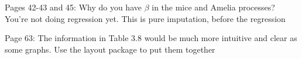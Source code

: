 \documentclass[12pt]{article}
\begin{document}
\begin{coi}
		\item Pages 42-43 and 45: Why do you have $\beta$ in the mice and Amelia processes? You're not doing regression yet. This is pure imputation, before the regression
		\item Page 63: The information in Table 3.8 would be much more intuitive and clear as some graphs. Use the layout package to put them together

\end{coi}
\end{document}
